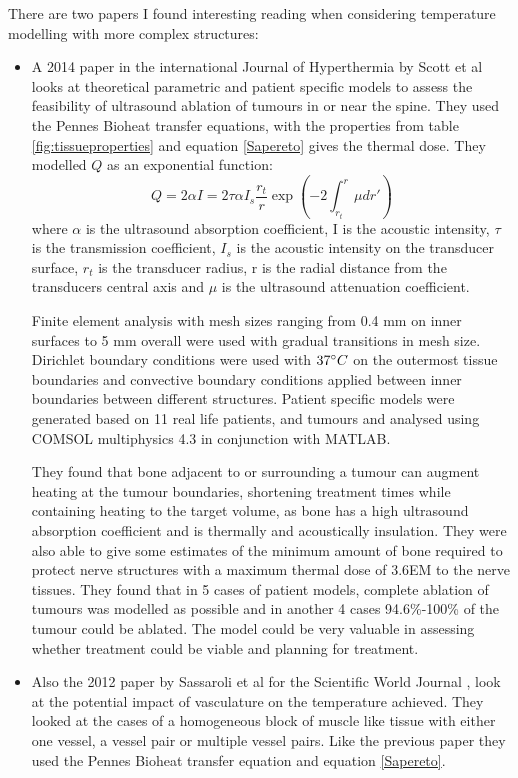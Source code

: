 \documentclass[11pt]{article} %
\begin{document}
There are two papers I found interesting reading when considering temperature modelling with more complex structures:
\begin{itemize}
	\item A 2014 paper in the international Journal of Hyperthermia by Scott et al \cite{Scott2014} looks at theoretical parametric and patient specific models to assess the feasibility of ultrasound ablation of tumours in or near the spine. They used the Pennes Bioheat transfer equations, with the properties from table \ref{fig:tissueproperties} and equation \ref{Sapereto} gives the thermal dose. They modelled $ Q $ as an exponential function:
	\begin{equation}
	Q=2\alpha I=2\tau \alpha I_s\frac{r_t}{r}\exp\left( -2\int_{r_t}^r \mu dr' \right) \label{ComplicatedQ}
	\end{equation}
	where $ \alpha $ is the ultrasound absorption coefficient, I is the acoustic intensity, $ \tau $ is the transmission coefficient, $ I_s $ is the acoustic intensity on the transducer surface, $ r_t $ is the transducer radius, r is the radial distance from the transducers central axis and $ \mu $ is the ultrasound attenuation coefficient.
	
	Finite element analysis with mesh sizes ranging from 0.4 mm on inner surfaces to 5 mm overall were used with gradual transitions in mesh size. Dirichlet boundary conditions were used with $ 37\degree C $ on the outermost tissue boundaries and convective boundary conditions applied between inner boundaries between different structures. Patient specific models were generated based on 11 real life patients, and tumours and analysed using COMSOL multiphysics 4.3 in conjunction with MATLAB. 
	
	They found that bone adjacent to or surrounding a tumour can augment heating at the tumour boundaries, shortening treatment times while containing heating to the target volume, as bone has a high ultrasound absorption coefficient and is thermally and acoustically insulation. They were also able to give some estimates of the minimum amount of bone required to protect nerve structures with a maximum thermal dose of  3.6EM to the nerve tissues. They found that in 5 cases of patient models, complete ablation of tumours was modelled as possible and in another 4 cases 94.6\%-100\% of the tumour could be ablated. The model could be very valuable in assessing whether treatment could be viable and planning for treatment. 
	\item Also the 2012 paper by Sassaroli et al for the Scientific World Journal \cite{Sassaroli2012},  look at the potential impact of vasculature on the temperature achieved. They looked at the cases of a homogeneous block of muscle like tissue with either one vessel, a vessel pair or multiple vessel pairs. Like the previous paper they used the Pennes Bioheat transfer equation and equation \ref{Sapereto}. 
	

\end{itemize}
\end{document}
